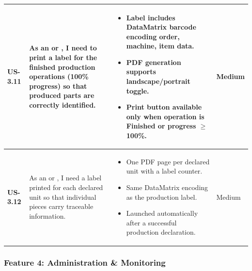 \begin{longtable}{p{1.5cm} p{5cm} p{6.5cm} p{2cm}}
	\textbf{US-3.11} &
	As an \userrole{Operator} or \userrole{Supervisor}, I need to print a label
	for the finished production operations (100\% progress) so that produced parts are correctly identified.
	&
	\begin{itemize}[nosep, leftmargin=*]
	\item Label includes DataMatrix barcode encoding order, machine, item data.
	\item PDF generation supports landscape/portrait toggle.
	\item Print button available only when operation is Finished or progress
	$\geq$ 100\%.
	\end{itemize}
	& Medium \\ \midrule

	\textbf{US-3.12} &
	As an \userrole{Operator} or \userrole{Supervisor}, I need a label printed
	for each declared unit so that individual pieces carry traceable information.
	&
	\begin{itemize}[nosep, leftmargin=*]
	\item One PDF page per declared unit with a label counter.
	\item Same DataMatrix encoding as the production label.
	\item Launched automatically after a successful production declaration.
	\end{itemize}
	& Medium \\
	\bottomrule
\end{longtable}


\subsubsection*{Feature 4: Administration \& Monitoring}
\label{domain4}

\vspace{0.3cm}


